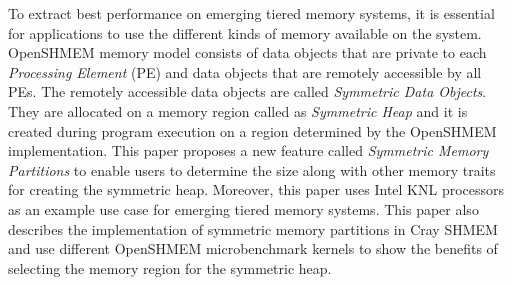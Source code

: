 To extract best performance on emerging tiered memory systems,
it is essential for applications to use the different kinds of
memory available on the system. OpenSHMEM memory model consists of
data objects that are private to each \emph{Processing Element}
(PE) and data objects that are remotely accessible by all PEs. The
remotely accessible data objects are called \emph{Symmetric Data
Objects}. They are allocated on a memory region called as
\emph{Symmetric Heap} and it is created during program execution
on a region determined by the OpenSHMEM implementation. This paper
proposes a new feature called \emph{Symmetric Memory Partitions} to
enable users to determine the size along with other memory traits
for creating the symmetric heap. Moreover, this paper uses Intel KNL
processors
as an example use case for emerging tiered memory systems. This paper
also describes the implementation of symmetric memory partitions in
Cray SHMEM and use different OpenSHMEM microbenchmark kernels to
show the benefits of selecting the memory region for the symmetric
heap.

